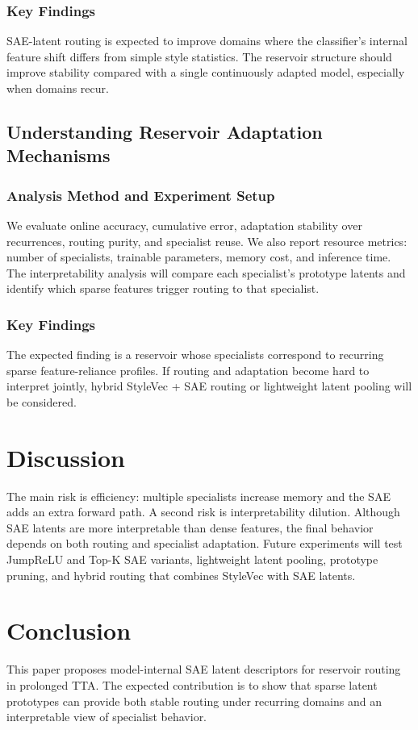 \documentclass{article}
\begin{document}
\subsubsection{Key Findings}

SAE-latent routing is expected to improve domains where the classifier's internal feature shift differs from simple style statistics. The reservoir structure should improve stability compared with a single continuously adapted model, especially when domains recur.

\subsection{Understanding Reservoir Adaptation Mechanisms}

\subsubsection{Analysis Method and Experiment Setup}

We evaluate online accuracy, cumulative error, adaptation stability over recurrences, routing purity, and specialist reuse. We also report resource metrics: number of specialists, trainable parameters, memory cost, and inference time. The interpretability analysis will compare each specialist's prototype latents and identify which sparse features trigger routing to that specialist.

\subsubsection{Key Findings}

The expected finding is a reservoir whose specialists correspond to recurring sparse feature-reliance profiles. If routing and adaptation become hard to interpret jointly, hybrid StyleVec + SAE routing or lightweight latent pooling will be considered.

\section{Discussion}

The main risk is efficiency: multiple specialists increase memory and the SAE adds an extra forward path. A second risk is interpretability dilution. Although SAE latents are more interpretable than dense features, the final behavior depends on both routing and specialist adaptation. Future experiments will test JumpReLU and Top-K SAE variants, lightweight latent pooling, prototype pruning, and hybrid routing that combines StyleVec with SAE latents.

\section{Conclusion}

This paper proposes model-internal SAE latent descriptors for reservoir routing in prolonged TTA. The expected contribution is to show that sparse latent prototypes can provide both stable routing under recurring domains and an interpretable view of specialist behavior.



\end{document}
